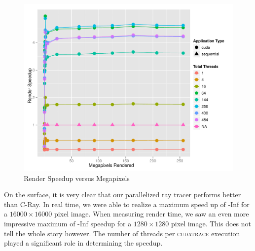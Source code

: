 \documentclass[12pt]{article}
\begin{document}
\begin{figure}
    \caption{Render Speedup versus Megapixels} \label{fig:render_speedup}
    \begin{center}
\includegraphics{cudatrace-007}
    \end{center}
\end{figure}

On the surface, it is very clear that our parallelized ray tracer performs better than C-Ray. In real time, we were able to realize a maximum speed up of -Inf for a $16000\times 16000$ pixel image. When measuring render time, we saw an even more impressive maximum of -Inf speedup for a $1280 \times 1280$ pixel image. This does not tell the whole story however. The number of threads per \textsc{cudatrace} execution played a significant role in determining the speedup.
\end{document}
